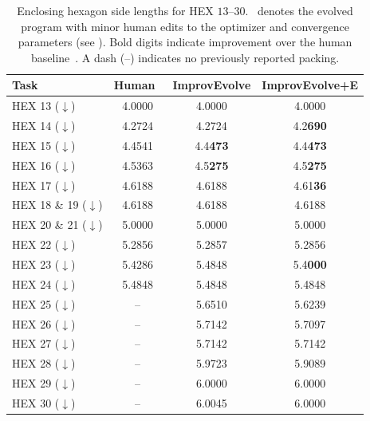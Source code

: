 \documentclass[sigconf]{acmart}
\begin{document}
\begin{table}[t]
    \centering
    \caption{Enclosing hexagon side lengths for HEX $13$--$30$. \improvevolvepluse\ denotes the evolved program with minor human edits to the optimizer and convergence parameters (see ). Bold digits indicate improvement over the human baseline~\cite{friedman2025packing}. A dash (--) indicates no previously reported packing.}
    \label{tab:hex_large_scale}
    \small
    \begin{tabular}{l|c|c|c}
        \toprule
        \textbf{Task} & \textbf{Human}~\cite{friedman2025packing} & \textbf{ImprovEvolve} & \textbf{ImprovEvolve+E} \\
        \midrule
        HEX 13 ($\downarrow$) & 4.0000 & 4.0000 & 4.0000\\
        HEX 14 ($\downarrow$) & 4.2724 & 4.2724 & 4.2\textbf{690}\\
        HEX 15 ($\downarrow$) & 4.4541 & 4.4\textbf{473} & 4.4\textbf{473} \\
        HEX 16 ($\downarrow$) & 4.5363 & 4.5\textbf{275} & 4.5\textbf{275} \\
        HEX 17 ($\downarrow$) & 4.6188 & 4.6188 & 4.61\textbf{36} \\
        HEX 18 \& 19 ($\downarrow$) & 4.6188 & 4.6188 & 4.6188 \\
        HEX 20 \& 21 ($\downarrow$) & 5.0000 & 5.0000 & 5.0000 \\
        HEX 22 ($\downarrow$) & 5.2856 & 5.2857 & 5.2856\\
        HEX 23 ($\downarrow$) & 5.4286 & 5.4848 & 5.4\textbf{000}\\
        HEX 24 ($\downarrow$) & 5.4848 & 5.4848 & 5.4848 \\
        HEX 25 ($\downarrow$) & -- & 5.6510 & 5.6239 \\
        HEX 26 ($\downarrow$) & -- & 5.7142 & 5.7097 \\
        HEX 27 ($\downarrow$) & -- & 5.7142 & 5.7142 \\
        HEX 28 ($\downarrow$) & -- & 5.9723 & 5.9089 \\
        HEX 29 ($\downarrow$) & -- & 6.0000 & 6.0000 \\
        HEX 30 ($\downarrow$) & -- & 6.0045 & 6.0000 \\
        \bottomrule
    \end{tabular}
\end{table}
\end{document}
